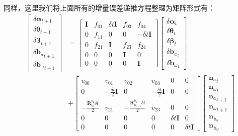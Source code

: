 \begin{enumerate}
	同样，这里我们将上面所有的增量误差递推方程整理为矩阵形式有：
	\begin{equation}
	\begin{aligned}
	\left[\begin{array}{c}
	\delta\bm{\alpha}_{t+1}\\\delta\bm{\theta}_{t+1}\\\delta\bm{\beta}_{t+1}\\
	\delta{\bm{b}_a}_{t+1}\\\delta{\bm{b}_\omega}_{t+1}
	\end{array}\right]&=
	\left[\begin{matrix}
	\bm{I} & f_{01} & \delta t\bm{I} & f_{03} & f_{04}\\
	 0 & f_{11} & 0 & 0 & -\delta t\bm{I}\\
	 0 & f_{21} & \bm{I} & f_{23} & f_{24} \\
	 0 & 0 & 0 & \bm{I} & 0 \\
	 0 & 0 & 0 & 0 & \bm{I}
	\end{matrix}\right]\left[\begin{array}{c}
	\delta\bm{\alpha}_t\\\delta\bm{\theta}_t\\\delta\bm{\beta}_t\\
	\delta{\bm{b}_a}_t\\\delta{\bm{b}_\omega}_t
	\end{array}\right]\\
	&+\left[\begin{matrix}
	v_{00} & v_{01} & v_{02} & v_{03} & 0 & 0\\
	0 & -\frac{\delta t}{2}\bm{I} & 0 & -\frac{\delta t}{2}\bm{I} & 0 & 0\\
	-\frac{\bm{R}_{b_t}^{b_k}\delta t}{2} & v_{21} & -\frac{\bm{R}_{b_{t+1}}^{b_k}\delta t}{2} & v_{23} & 0 & 0\\
	0 & 0 & 0 & 0 & \delta t\bm{I} & 0\\
	0 & 0 & 0 & 0 & 0 & \delta t\bm{I}
	\end{matrix}\right]\left[\begin{array}{c}
	{\bm{n}_a}_t\\{\bm{n}_\omega}_t\\{\bm{n}_a}_{t+1}\\{\bm{n}_\omega}_{t+1}\\
	\bm{n}_{\bm{b}_a}\\\bm{n}_{\bm{b}_\omega}
	\end{array}\right]
	\end{aligned}
	\end{equation}

\end{enumerate}
